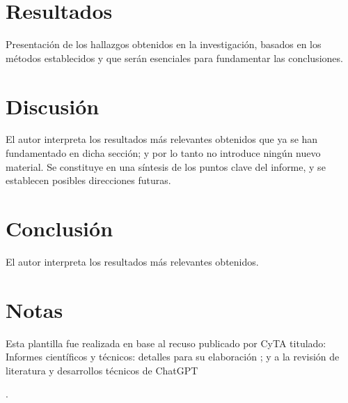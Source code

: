 \documentclass[a4paper,12pt]{article}
\begin{document}
\section{Resultados}
Presentación de los hallazgos obtenidos en la investigación, basados en los métodos establecidos y que serán esenciales para fundamentar las conclusiones. 


\section{Discusión}
El autor interpreta los resultados más relevantes obtenidos que ya se han fundamentado en dicha sección; y por lo tanto no introduce ningún nuevo material. Se constituye en una síntesis de los puntos clave del informe, y se establecen posibles direcciones futuras.

\section{Conclusión}
El autor interpreta los resultados más relevantes obtenidos.

\section{Notas}
Esta plantilla fue realizada en base al recuso publicado por CyTA titulado: Informes científicos y técnicos: detalles para su elaboración \cite{Perissé2019}; y a la revisión de literatura y desarrollos técnicos de ChatGPT\cite{ChatGPT2025}

.


\printbibliography %
\end{document}
